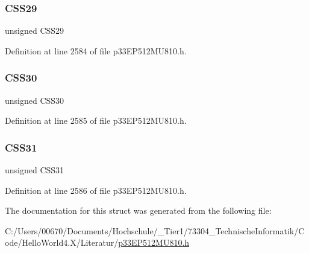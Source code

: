 \subsubsection{\texorpdfstring{C\+S\+S29}{CSS29}}
{\footnotesize\ttfamily unsigned C\+S\+S29}



Definition at line 2584 of file p33\+E\+P512\+M\+U810.\+h.

\mbox{\label{structtag_a_d1_c_s_s_h_b_i_t_s_a361b68bd74d71746af4c98eae8e3d16a}} 
\subsubsection{\texorpdfstring{C\+S\+S30}{CSS30}}
{\footnotesize\ttfamily unsigned C\+S\+S30}



Definition at line 2585 of file p33\+E\+P512\+M\+U810.\+h.

\mbox{\label{structtag_a_d1_c_s_s_h_b_i_t_s_a29d0589107c10e2aa85c6c753f95c11c}} 
\subsubsection{\texorpdfstring{C\+S\+S31}{CSS31}}
{\footnotesize\ttfamily unsigned C\+S\+S31}



Definition at line 2586 of file p33\+E\+P512\+M\+U810.\+h.



The documentation for this struct was generated from the following file\+:\begin{DoxyCompactItemize}
\item 
C\+:/\+Users/00670/\+Documents/\+Hochschule/\+\_\+\+Tier1/73304\+\_\+\+Technische\+Informatik/\+Code/\+Hello\+World4.\+X/\+Literatur/\hyperlink{p33_e_p512_m_u810_8h}{p33\+E\+P512\+M\+U810.\+h}\end{DoxyCompactItemize}
